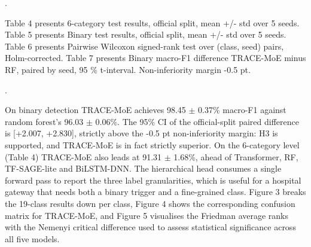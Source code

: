 \documentclass[11pt]{article}
\begin{document}
\begin{table}[htbp]
\centering

\caption{19-class test results, official split, mean +/- std over 5 seeds.}
\label{tab:3}
\end{table}

.

Table 4 presents 6-category test results, official split, mean +/- std over 5 seeds. Table 5 presents Binary test results, official split, mean +/- std over 5 seeds. Table 6 presents Pairwise Wilcoxon signed-rank test over (class, seed) pairs, Holm-corrected. Table 7 presents  Binary macro-F1 difference TRACE-MoE minus RF, paired by seed, 95 \% t-interval. Non-inferiority margin -0.5 pt.

\begin{table}[htbp]
\centering

\caption{6-category test results, official split, mean +/- std over 5 seeds.}
\label{tab:4}
\end{table}

\begin{table}[htbp]
\centering

\caption{Binary test results, official split, mean +/- std over 5 seeds.}
\label{tab:5}
\end{table}

.

\begin{table}[htbp]
\centering

\caption{Pairwise Wilcoxon signed-rank test over (class, seed) pairs, Holm-corrected.}
\label{tab:6}
\end{table}

\begin{table}[htbp]
\centering

\caption{Binary macro-F1 difference TRACE-MoE minus RF, paired by seed, 95 \% t-interval. Non-inferiority margin -0.5 pt.}
\label{tab:7}
\end{table}

On binary detection TRACE-MoE achieves 98.45 $\pm$ 0.37\% macro-F1 against random forest's 96.03 $\pm$ 0.06\%. The 95\% CI of the official-split paired difference is [+2.007, +2.830], strictly above the -0.5 pt non-inferiority margin: H3 is supported, and TRACE-MoE is in fact strictly superior. On the 6-category level (Table 4) TRACE-MoE also leads at 91.31 $\pm$ 1.68\%, ahead of Transformer, RF, TF-SAGE-lite and BiLSTM-DNN. The hierarchical head consumes a single forward pass to report the three label granularities, which is useful for a hospital gateway that needs both a binary trigger and a fine-grained class. Figure 3 breaks the 19-class results down per class, Figure 4 shows the corresponding confusion matrix for TRACE-MoE, and Figure 5 visualises the Friedman average ranks with the Nemenyi critical difference used to assess statistical significance across all five models.
\end{document}
